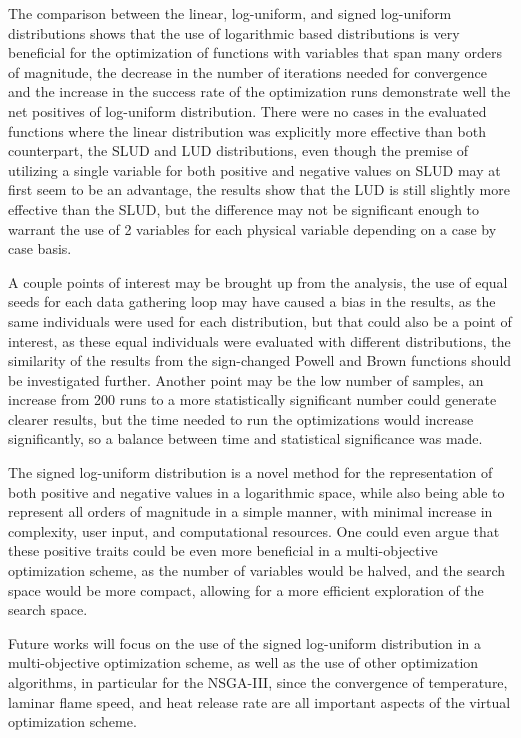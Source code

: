 \documentclass[10pt,fleqn,a4paper,twoside]{article}
\begin{document}
The comparison between the linear, log-uniform, and signed log-uniform distributions shows that the use of logarithmic based distributions is very beneficial for the optimization of functions with variables that span many orders of magnitude, 
the decrease in the number of iterations needed for convergence and the increase in the success rate of the optimization runs demonstrate well the net positives of log-uniform distribution.
There were no cases in the evaluated functions where the linear distribution was explicitly more effective than both counterpart, the SLUD and LUD distributions, even though the premise of utilizing a single
variable for both positive and negative values on SLUD may at first seem to be an advantage, the results show that the LUD is still slightly more effective than the SLUD, but the difference
may not be significant enough to warrant the use of 2 variables for each physical variable depending on a case by case basis.

A couple points of interest may be brought up from the analysis, the use of equal seeds for each data gathering loop may have caused a bias in the results, as the same individuals were used for each distribution,
but that could also be a point of interest, as these equal individuals were evaluated with different distributions, the similarity of the results from the sign-changed Powell and Brown functions should be investigated further. Another point may be the low number of samples, an increase from 200 runs to a more statistically significant number could
generate clearer results, but the time needed to run the optimizations would increase significantly, so a balance between time and statistical significance was made. 

The signed log-uniform distribution is a novel method for the representation of both positive and negative values in a logarithmic space, while also being able to represent all orders of magnitude in a
simple manner, with minimal increase in complexity, user input, and computational resources. One could even argue that these positive traits could be even more beneficial in a multi-objective optimization scheme, as the number of variables would be halved, and the search space would be more compact, allowing for a more efficient exploration of the search space.

Future works will focus on the use of the signed log-uniform distribution in a multi-objective optimization scheme, as well as the use of other optimization algorithms, in particular for the NSGA-III,
since the convergence of temperature, laminar flame speed, and heat release rate are all important aspects of the virtual optimization scheme.
\end{document}
